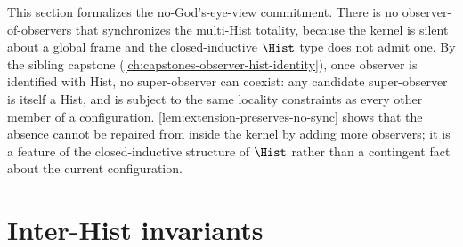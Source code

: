\begin{remark}
\label{rem:no-gods-eye}
This section formalizes the no-God's-eye-view commitment. There is no observer-of-observers that synchronizes the multi-Hist totality, because the kernel is silent about a global frame and the closed-inductive \(\Hist\) type does not admit one. By the sibling capstone (\autoref{ch:capstones-observer-hist-identity}), once observer is identified with Hist, no super-observer can coexist: any candidate super-observer is itself a Hist, and is subject to the same locality constraints as every other member of a configuration. \autoref{lem:extension-preserves-no-sync} shows that the absence cannot be repaired from inside the kernel by adding more observers; it is a feature of the closed-inductive structure of \(\Hist\) rather than a contingent fact about the current configuration.
\end{remark}

\section{Inter-Hist invariants}
\label{sec:inter-hist-invariants}

